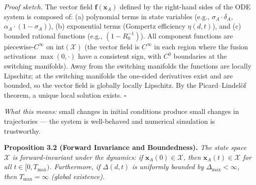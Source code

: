 \textit{Proof sketch.} The vector field $\mathbf{f}(\mathbf{x}_A)$ defined
by the right-hand sides of the ODE system is composed of: (a) polynomial
terms in state variables (e.g., $\sigma_A \cdot \delta_A$, $\alpha_A \cdot (1-\sigma_A)$),
(b) exponential terms (Gompertz efficiency $\eta(d,t)$), and (c) bounded
rational functions (e.g., $(1 - R_0^{-1})$). All component functions are
piecewise-$C^\infty$ on $\text{int}(\mathcal{X})$ (the vector field is $C^\infty$ in each region where the fusion activations $\max(0,\cdot)$ have a consistent sign, with $C^0$ boundaries at the switching manifolds). Away from the switching manifolds the functions are locally Lipschitz; at the switching manifolds the one-sided derivatives exist and are bounded, so the vector field is globally locally Lipschitz. By the Picard--Lindel\"of theorem, a unique local solution exists. $\square$

\noindent\textit{What this means:} small changes in initial conditions
produce small changes in trajectories --- the system is well-behaved and
numerical simulation is trustworthy.

\textbf{Proposition 3.2 (Forward Invariance and Boundedness).} %
\textit{The state space $\mathcal{X}$ is forward-invariant under the dynamics:
if $\mathbf{x}_A(0) \in \mathcal{X}$, then $\mathbf{x}_A(t) \in \mathcal{X}$
for all $t \in [0, T_{\max})$. Furthermore, if $\Delta(d,t)$ is uniformly
bounded by $\Delta_{\max} < \infty$, then $T_{\max} = \infty$ (global existence).}

